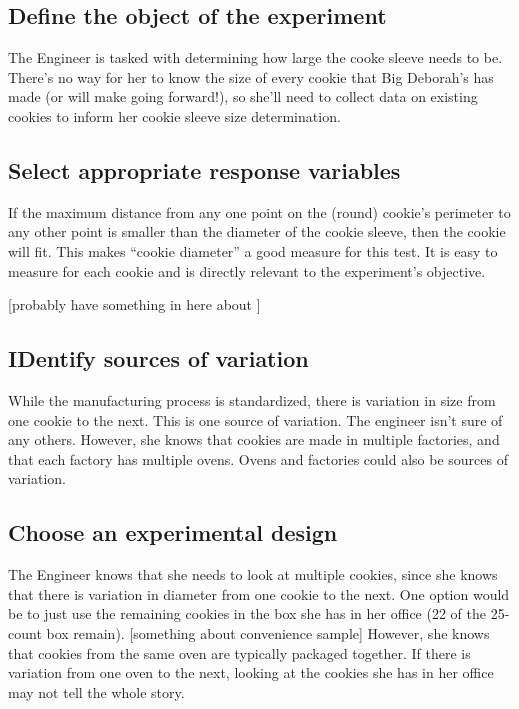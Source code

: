 \documentclass[
]{book}
\theoremstyle{definition}
\theoremstyle{definition}
\theoremstyle{definition}
\theoremstyle{remark}
\begin{document}
\hypertarget{define-the-object-of-the-experiment}{%
\subsection{Define the object of the experiment}\label{define-the-object-of-the-experiment}}

The Engineer is tasked with determining how large the cooke sleeve needs to be. There's no way for her to know the size of every cookie that Big Deborah's has made (or will make going forward!), so she'll need to collect data on existing cookies to inform her cookie sleeve size determination.

\hypertarget{select-appropriate-response-variables}{%
\subsection{Select appropriate response variables}\label{select-appropriate-response-variables}}

If the maximum distance from any one point on the (round) cookie's perimeter to any other point is smaller than the diameter of the cookie sleeve, then the cookie will fit. This makes ``cookie diameter'' a good measure for this test. It is easy to measure for each cookie and is directly relevant to the experiment's objective.

{[}probably have something in here about {]}

\hypertarget{identify-sources-of-variation}{%
\subsection{IDentify sources of variation}\label{identify-sources-of-variation}}

While the manufacturing process is standardized, there is variation in size from one cookie to the next. This is one source of variation. The engineer isn't sure of any others. However, she knows that cookies are made in multiple factories, and that each factory has multiple ovens. Ovens and factories could also be sources of variation.

\hypertarget{choose-an-experimental-design-2}{%
\subsection{Choose an experimental design}\label{choose-an-experimental-design-2}}

The Engineer knows that she needs to look at multiple cookies, since she knows that there is variation in diameter from one cookie to the next. One option would be to just use the remaining cookies in the box she has in her office (22 of the 25-count box remain). {[}something about convenience sample{]} However, she knows that cookies from the same oven are typically packaged together. If there is variation from one oven to the next, looking at the cookies she has in her office may not tell the whole story.
\end{document}
